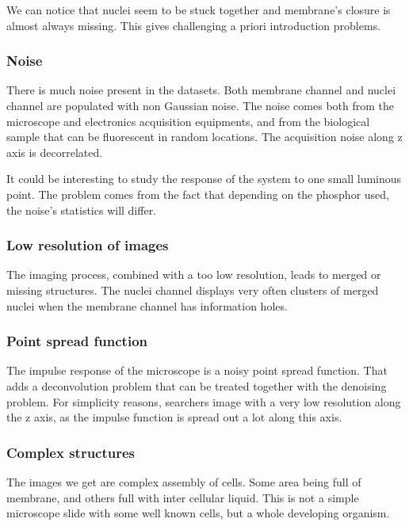 We can notice that nuclei seem to be stuck together and membrane's closure is almost always missing. This gives challenging a priori introduction problems.


\subsubsection{Noise}

There is much noise present in the datasets. Both membrane channel and nuclei channel are populated with non Gaussian noise.
The noise comes both from the microscope and electronics acquisition equipments, and from the biological sample that can be fluorescent in random locations.
The acquisition noise along z axis is decorrelated.

It could be interesting to study the response of the system to one small luminous point. The problem comes from the fact that depending on the phosphor used, the noise's statistics will differ.

\subsubsection{Low resolution of images}

The imaging process, combined with a too low resolution, leads to merged or missing structures. The nuclei channel displays very often clusters of merged nuclei when the membrane channel has information holes.

\subsubsection{Point spread function}

The impulse response of the microscope is a noisy point spread function. That adds a deconvolution problem that can be treated together with the denoising problem. For simplicity reasons, searchers image with a very low resolution along the z axis, as the impulse function is spread out a lot along this axis.

\subsubsection{Complex structures}

The images we get are complex assembly of cells.
Some area being full of membrane, and others full with inter cellular liquid.
This is not a simple microscope slide with some well known cells, but a whole developing organism.


